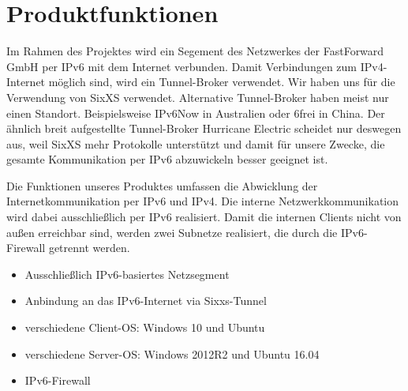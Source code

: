 \section{Produktfunktionen}

Im Rahmen des Projektes wird ein Segement des Netzwerkes der FastForward GmbH per IPv6 mit dem Internet verbunden. Damit Verbindungen zum IPv4-Internet möglich sind, wird ein Tunnel-Broker verwendet. Wir haben uns für die Verwendung von SixXS verwendet. Alternative Tunnel-Broker haben meist nur einen Standort. Beispielsweise IPv6Now in Australien oder 6frei in China. Der ähnlich breit aufgestellte Tunnel-Broker Hurricane Electric scheidet nur deswegen aus, weil SixXS mehr Protokolle unterstützt und damit für unsere Zwecke, die gesamte Kommunikation per IPv6 abzuwickeln besser geeignet ist.

Die Funktionen unseres Produktes umfassen die Abwicklung der Internetkommunikation per IPv6 und IPv4. Die interne Netzwerkkommunikation wird dabei ausschließlich per IPv6 realisiert. Damit die internen Clients nicht von außen erreichbar sind, werden zwei Subnetze realisiert, die durch die IPv6-Firewall getrennt werden.

\begin{itemize}
	\item Ausschließlich IPv6-basiertes Netzsegment
	\item Anbindung an das IPv6-Internet via Sixxs-Tunnel
	\item verschiedene Client-OS: Windows 10 und Ubuntu
	\item verschiedene Server-OS: Windows 2012R2 und Ubuntu 16.04
	\item IPv6-Firewall
\end{itemize}

